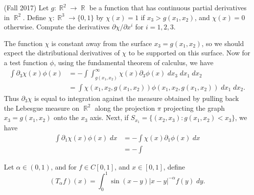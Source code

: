\documentclass{exam}
\DeclareMathOperator{\RR}{\mathbb{R}}
\theoremstyle{problemstyle}
\newcommand{\1}[1]{\textbf{1}_{\left[#1\right]}} %
\begin{document}
\begin{questions}
\question (Fall 2017) Let $g: \RR^2 \to \RR$ be a function that has continuous partial derivatives in $\RR^2$. Define $\chi: \RR^3 \to \{ 0, 1 \}$ by $\chi(x) = 1$ if $x_3 > g(x_1,x_2)$, and $\chi(x) = 0$ otherwise. Compute the derivatives $\partial \chi / \partial x^i$ for $i = 1, 2, 3$.
\begin{solution}
		The function $\chi$ is constant away from the surface $x_3 = g(x_1,x_2)$, so we should expect the distributional derivatives of $\chi$ to be supported on this surface. Now for a test function $\phi$, using the fundamental theorem of calculus, we have
		\begin{align*}
			\int \partial_3 \chi(x) \phi(x) &= - \int \int_{g(x_1,x_2)}^\infty \chi(x) \partial_3 \phi(x)\; dx_3 \; dx_1\; dx_2\\
			&= \int \chi(x_1,x_2, g(x_1,x_2)) \phi(x_1,x_2,g(x_1,x_2))\; dx_1\; dx_2.
		\end{align*}
		Thus $\partial_3 \chi$ is equal to integration against the measure obtained by pulling back the Lebesgue measure on $\RR^2$ along the projection $\pi$ projecting the graph $x_3 = g(x_1,x_2)$ onto the $x_3$ axis. Next, if $S_{x_1} = \{ (x_2,x_3): g(x_1,x_2) < x_3 \}$, we have
		\begin{align*}
			\int \partial_1 \chi(x) \phi(x)\; dx &= - \int \chi(x) \partial_1 \phi(x)\; dx\\
			&= - \int 
		\end{align*}
\end{solution}

\question Let $\alpha \in (0,1)$, and for $f \in C[0,1]$, and $x \in [0,1]$, define
%
\[ (T_\alpha f)(x) = \int_0^1 \sin(x-y) |x-y|^{-\alpha} f(y)\; dy. \]
\begin{parts}

\end{parts}
\end{questions}
\end{document}
